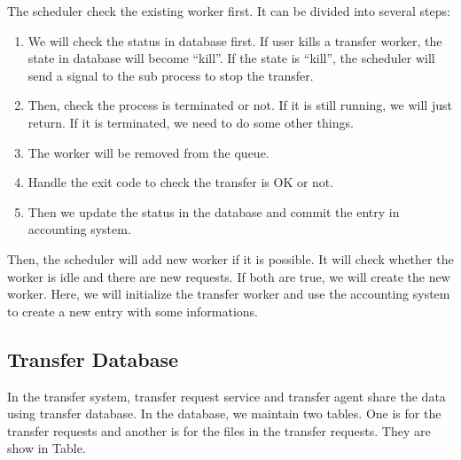 The scheduler check the existing worker first.
It can be divided into several steps:
\begin{enumerate}
    \item We will check the status in database first.
          If user kills a transfer worker, the state in
          database will become ``kill''.
          If the state is ``kill'', the scheduler will
          send a signal to the sub process to stop the
          transfer.
    \item Then, check the process is terminated or not.
          If it is still running, we will just return.
          If it is terminated, we need to do some other things.
    \item The worker will be removed from the queue.
    \item Handle the exit code to check the transfer is OK or not.
    \item Then we update the status in the database 
          and commit the entry in accounting system.
\end{enumerate}

Then, the scheduler will add new worker if it is possible.
It will check whether the worker is idle and there are new requests.
If both are true, we will create the new worker.
Here, we will initialize the transfer worker and use the accounting
system to create a new entry with some informations.


\subsection{Transfer Database}

In the transfer system, transfer request service and transfer agent
share the data using transfer database. In the database, we maintain
two tables. One is for the transfer requests and another is for the 
files in the transfer requests. They are show in Table.


